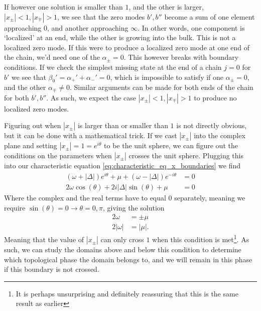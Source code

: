 If however one solution is smaller than $1$, and the other is larger, $|x_\pm| < 1, |x_\mp| > 1$, we see that the zero modes $b', b''$ become a sum of one element approaching $0$, and another approaching $\infty$. In other words, one component is `localized' at an end, while the other is growing into the bulk. This is not a localized zero mode. If this were to produce a localized zero mode at one end of the chain, we'd need one of the $\alpha_\pm = 0$. This however breaks with boundary conditions. If we check the simplest missing state at the end of a chain $j=0$ for $b'$ we see that $\beta_0' = \alpha_+' + \alpha_-' = 0$, which is impossible to satisfy if one $\alpha_\pm = 0$, and the other $\alpha_\mp \neq 0$. Similar arguments can be made for both ends of the chain for both $b', b''$. As such, we expect the case $|x_\pm| < 1, |x_\mp| > 1$ to produce no localized zero modes.

Figuring out when $|x_\pm|$ is larger than or smaller than $1$ is not directly obvious, but it can be done with a mathematical trick. If we cast $|x_\pm|$ into the complex plane and setting $|x_\pm| = 1 = e^{i\theta}$ to be the unit sphere, we can figure out the conditions on the parameters when $|x_\pm|$ crosses the unit sphere. Plugging this into our characteristic equation \ref{eq:characteristic_eq_x_boundaries} we find 
\begin{align}
    \left(\omega + |\Delta|\right) e^{i\theta} + \mu + \left(\omega - |\Delta| \right) e^{-i\theta} &= 0 \\
    2\omega \cos(\theta) + 2 i |\Delta| \sin(\theta) + \mu &= 0
\end{align}
Where the complex and the real terms have to equal $0$ separately, meaning we require $\sin(\theta) = 0 \to \theta = 0, \pi$, giving the solution
\begin{align}
    2\omega &= \pm \mu\\
    2 |\omega| &= |\mu|.
\end{align}
Meaning that the value of $|x_\pm|$ can only cross $1$ when this condition is met\footnote{It is perhaps unsurprising and definitely reassuring that this is the same result as earlier}. As such, we can study the domains above and below this condition to determine which topological phase the domain belongs to, and we will remain in this phase if this boundary is not crossed.

